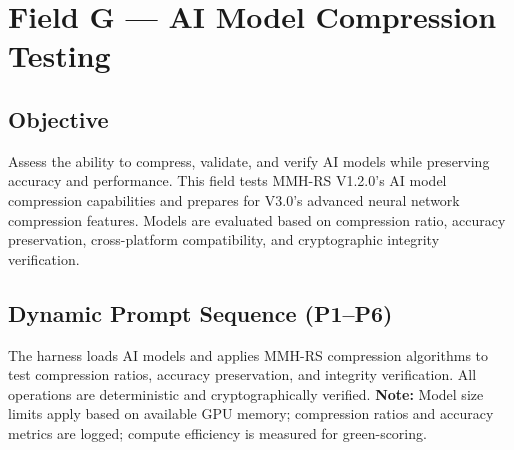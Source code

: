 \section{Field G — AI Model Compression Testing}
\label{sec:fieldG}

\subsection*{Objective}
Assess the ability to compress, validate, and verify AI models while preserving accuracy and performance. This field tests MMH-RS V1.2.0's AI model compression capabilities and prepares for V3.0's advanced neural network compression features. Models are evaluated based on compression ratio, accuracy preservation, cross-platform compatibility, and cryptographic integrity verification.

\subsection*{Dynamic Prompt Sequence (P1–P6)}
The harness loads AI models and applies MMH-RS compression algorithms to test compression ratios, accuracy preservation, and integrity verification. All operations are deterministic and cryptographically verified.
\textbf{Note:} Model size limits apply based on available GPU memory; compression ratios and accuracy metrics are logged; compute efficiency is measured for green-scoring.

